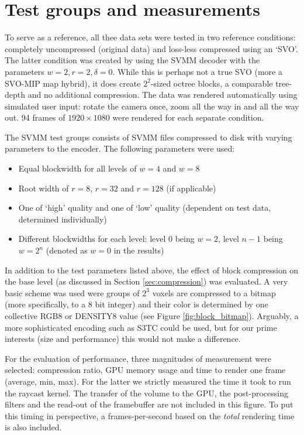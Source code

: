 \section{Test groups and measurements}
%
To serve as a reference, all thee data sets were tested in two reference conditions: completely uncompressed (original data) and loss-less compressed using an `SVO'. The latter condition was created by using the SVMM decoder with the parameters $w=2,r=2,\delta=0$. While this is perhaps not a true SVO (more a SVO-MIP map hybrid), it does create $2^2$-sized octree blocks, a comparable tree-depth and no additional compression. The data was rendered automatically using simulated user input: rotate the camera once, zoom all the way in and all the way out. 94 frames of $1920 \times 1080$ were rendered for each separate condition.

The SVMM test groups consists of SVMM files compressed to disk with varying parameters to the encoder. The following parameters were used:
\begin{itemize}
\item Equal blockwidth for all levels of $w=4$ and $w=8$
\item Root width of $r=8$, $r=32$ and $r=128$ (if applicable)
\item One of `high' quality and one of `low' quality (dependent on test data, determined individually)
\item Different blockwidths for each level: level 0 being $w=2$, level $n-1$ being $w=2^n$ (denoted as $w=0$ in the results)
\end{itemize}
%
In addition to the test parameters listed above, the effect of block compression on the base level (as discussed in Section \ref{sec:compression}) was evaluated. A very basic scheme was used were groups of $2^3$ voxels are compressed to a bitmap (more specifically, to a 8 bit integer) and their color is determined by one collective RGB8 or DENSITY8 value (see Figure \ref{fig:block_bitmap}).  Arguably, a more sophisticated encoding such as S3TC could be used, but for our prime interests (size and performance) this would not make a difference.

For the evaluation of performance, three magnitudes of measurement were selected: compression ratio, GPU memory usage and time to render one frame (average, min, max). For the latter we strictly measured the time it took to run the raycast kernel. The transfer of the volume to the GPU, the post-processing filters and the read-out of the framebuffer are not included in this figure. To put this timing in perspective, a frames-per-second based on the \emph{total} rendering time is also included.

